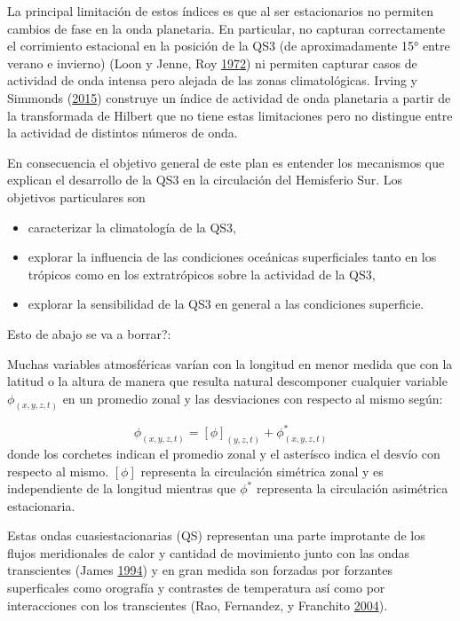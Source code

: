 \documentclass[spanish,a4paper,12p]{book}
\providecommand{\tightlist}{%
  \setlength{\itemsep}{0pt}\setlength{\parskip}{0pt}}
\begin{document}
La principal limitación de estos índices es que al ser estacionarios no
permiten cambios de fase en la onda planetaria. En particular, no
capturan correctamente el corrimiento estacional en la posición de la
QS3 (de aproximadamente 15° entre verano e invierno) (Loon y Jenne, Roy
\protect\hyperlink{ref-Loon1972}{1972}) ni permiten capturar casos de
actividad de onda intensa pero alejada de las zonas climatológicas.
Irving y Simmonds (\protect\hyperlink{ref-Irving2015}{2015}) construye
un índice de actividad de onda planetaria a partir de la transformada de
Hilbert que no tiene estas limitaciones pero no distingue entre la
actividad de distintos números de onda.

En consecuencia el objetivo general de este plan es entender los
mecanismos que explican el desarrollo de la QS3 en la circulación del
Hemisferio Sur. Los objetivos particulares son

\begin{itemize}
\tightlist
\item
  caracterizar la climatología de la QS3,
\item
  explorar la influencia de las condiciones oceánicas superficiales
  tanto en los trópicos como en los extratrópicos sobre la actividad de
  la QS3,
\item
  explorar la sensibilidad de la QS3 en general a las condiciones
  superficie.
\end{itemize}

Esto de abajo se va a borrar?:

Muchas variables atmosféricas varían con la longitud en menor medida que
con la latitud o la altura de manera que resulta natural descomponer
cualquier variable \(\phi_{(x, y, z, t)}\) en un promedio zonal y las
desviaciones con respecto al mismo según:

\[
\phi_{(x, y, z, t)} = [\phi]_{(y, z, t)} + \phi_{(x, y, z, t)}^*
\] donde los corchetes indican el promedio zonal y el asterísco indica
el desvío con respecto al mismo. \([\phi]\) representa la circulación
simétrica zonal y es independiente de la longitud mientras que
\(\phi^*\) representa la circulación asimétrica estacionaria.

Estas ondas cuasiestacionarias (QS) representan una parte improtante de
los flujos meridionales de calor y cantidad de movimiento junto con las
ondas transcientes (James \protect\hyperlink{ref-James}{1994}) y en gran
medida son forzadas por forzantes superficales como orografía y
contrastes de temperatura así como por interacciones con los
transcientes (Rao, Fernandez, y Franchito
\protect\hyperlink{ref-Rao2004}{2004}).
\end{document}
